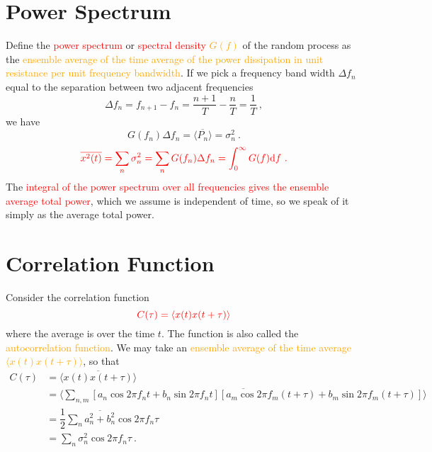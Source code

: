 \documentclass[12pt,a4paper]{article}
\newcommand{\dif}{\mathrm{d}}
\begin{document}
\section{Power Spectrum}
\cite{kittel1958elementary} Define the \textcolor{red}{power spectrum} or \textcolor{red}{spectral density} \textcolor{orange}{$G(f)$} of the random process as the \textcolor{orange}{ensemble average of the time average of the power dissipation in unit resistance per unit frequency bandwidth}. If we pick a frequency band width $\Delta f_n$ equal to the separation between two adjacent frequencies
\begin{equation}
\Delta f_n = f_{n+1} -f_{n}  = \dfrac{n+1}{T} - \dfrac{n}{T} = \dfrac{1}{T} ~,
\end{equation}
we have 
\begin{equation}
G(f_n) \Delta f_n = \overline{\langle P_n \rangle} = \sigma_n^2 ~.
\end{equation}
\begin{equation*}
\color{red} \overline{x^2(t)} = \sum_n \sigma_n^2 = \sum_n G(f_n) \Delta f_n = \int_0^\infty G(f) \dif f ~.
\end{equation*}
The \textcolor{red}{integral of the power spectrum over all frequencies gives the ensemble average total power}, which we assume is independent of time, so we speak of it simply as the average total power. 

\section{Correlation Function}
\cite{kittel1958elementary} Consider the correlation function
\begin{equation}
\color{red} C(\tau) = \langle x(t) x(t+\tau)\rangle
\end{equation}
where the average is over the time $t$. The function is also called the \textcolor{orange}{autocorrelation function}. We may take an \textcolor{orange}{ensemble average of the time average $\langle x(t) x(t+\tau)\rangle$}, so that
\begin{align}
\nonumber C(\tau) &= \overline{\langle x(t) x(t+\tau)\rangle} \\
\nonumber &= \overline{\langle \sum_{n,m} [a_n \cos 2\pi f_n t +b_n \sin 2\pi f_n t] [a_m \cos 2\pi f_m (t+\tau) +b_m \sin 2\pi f_m (t+\tau)]\rangle} \\
\nonumber &= \dfrac{1}{2} \sum_n \overline{a_n^2 +b_n^2} \cos 2\pi f_n \tau \\
&= \sum_n \sigma_n^2 \cos 2\pi f_n \tau ~.
\end{align}
\end{document}

